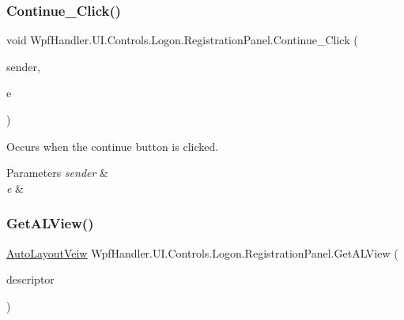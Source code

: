 \subsubsection{\texorpdfstring{Continue\+\_\+\+Click()}{Continue\_Click()}}
{\footnotesize\ttfamily void Wpf\+Handler.\+U\+I.\+Controls.\+Logon.\+Registration\+Panel.\+Continue\+\_\+\+Click (\begin{DoxyParamCaption}\item[{object}]{sender,  }\item[{Routed\+Event\+Args}]{e }\end{DoxyParamCaption})\hspace{0.3cm}{\ttfamily [private]}}



Occurs when the continue button is clicked. 


\begin{DoxyParams}{Parameters}
{\em sender} & \\
\hline
{\em e} & \\
\hline
\end{DoxyParams}
\mbox{\label{class_wpf_handler_1_1_u_i_1_1_controls_1_1_logon_1_1_registration_panel_a551818f7158462bf02d1733e83768197}} 
\subsubsection{\texorpdfstring{Get\+A\+L\+View()}{GetALView()}}
{\footnotesize\ttfamily \mbox{\hyperlink{class_wpf_handler_1_1_u_i_1_1_auto_layout_1_1_controls_1_1_auto_layout_veiw}{Auto\+Layout\+Veiw}} Wpf\+Handler.\+U\+I.\+Controls.\+Logon.\+Registration\+Panel.\+Get\+A\+L\+View (\begin{DoxyParamCaption}\item[{\mbox{\hyperlink{class_wpf_handler_1_1_u_i_1_1_auto_layout_1_1_form_descriptor}{Form\+Descriptor}}}]{descriptor }\end{DoxyParamCaption})\hspace{0.3cm}{\ttfamily [private]}}



